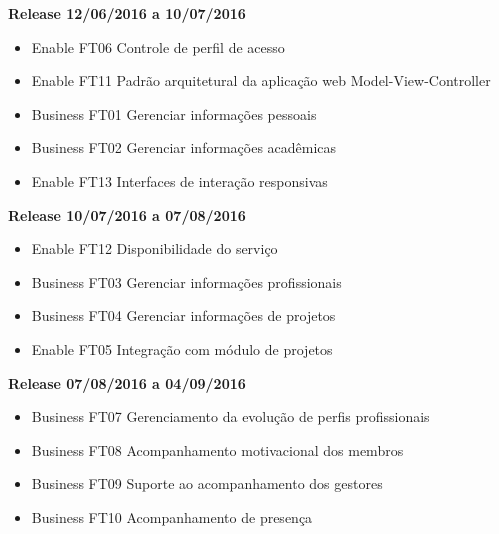 \textbf{Release 12/06/2016 a 10/07/2016}
\begin{itemize}
    \item Enable FT06 Controle de perfil de acesso
    \item Enable FT11 Padrão arquitetural da aplicação web Model-View-Controller
    \item Business FT01 Gerenciar informações pessoais
    \item Business FT02 Gerenciar informações acadêmicas
    \item Enable FT13 Interfaces de interação responsivas
\end{itemize}
\textbf{Release 10/07/2016 a 07/08/2016}
\begin{itemize}
    \item Enable FT12 Disponibilidade do serviço
    \item Business FT03 Gerenciar informações profissionais
    \item Business FT04 Gerenciar informações de projetos
    \item Enable FT05 Integração com módulo de projetos
\end{itemize}
\textbf{Release 07/08/2016 a 04/09/2016}
\begin{itemize}
    \item Business FT07 Gerenciamento da evolução de perfis profissionais
    \item Business FT08 Acompanhamento motivacional dos membros
    \item Business FT09 Suporte ao acompanhamento dos gestores
    \item Business FT10 Acompanhamento de presença
\end{itemize}
